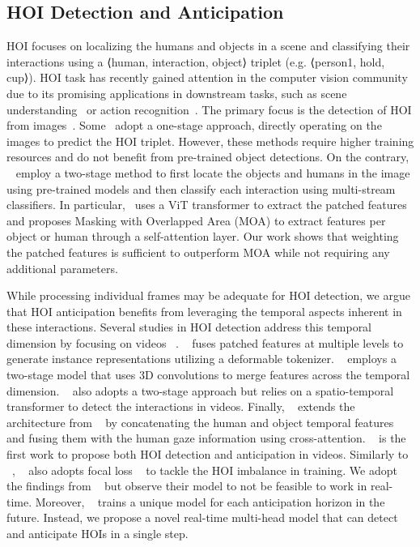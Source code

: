 \documentclass{article}
\begin{document}
\subsection{HOI Detection and Anticipation}
HOI focuses on localizing the humans and objects in a scene and classifying their interactions using a ⟨human, interaction, object⟩ triplet (e.g. ⟨person1, hold, cup⟩). HOI task has recently gained attention in the computer vision community due to its promising applications in downstream tasks, such as scene understanding~\citep{hoi_scene_understanding} or action recognition~\citep{hoi_har}. The primary focus is the detection of HOI from images~\citep{Xu2018, Ulutan2020, JunYI2023, Xiaoqian2022, Liao2022, park2023viplo}. Some~\citep{JunYI2023, Xiaoqian2022, Liao2022} adopt a one-stage approach, directly operating on the images to predict the HOI triplet. However, these methods require higher training resources and do not benefit from pre-trained object detections. On the contrary, ~\citep{Xu2018, Ulutan2020, park2023viplo} employ a two-stage method to first locate the objects and humans in the image using pre-trained models and then classify each interaction using multi-stream classifiers. In particular,~\citep{park2023viplo} uses a ViT transformer \citep{dosovitskiy2020vit} to extract the patched features and proposes Masking with Overlapped Area (MOA) to extract features per object or human through a self-attention layer. Our work shows that weighting the patched features is sufficient to outperform MOA while not requiring any additional parameters.

While processing individual frames may be adequate for HOI detection, we argue that HOI anticipation benefits from leveraging the temporal aspects inherent in these interactions. Several studies in HOI detection address this temporal dimension by focusing on videos ~\citep{Chiou2021, Cong2021, Tu2022, NI2023103741}. ~\citep{Tu2022} fuses patched features at multiple levels to generate instance representations utilizing a deformable tokenizer. ~\citep{Chiou2021} employs a two-stage model that uses 3D convolutions to merge features across the temporal dimension. ~\citep{Cong2021} also adopts a two-stage approach but relies on a spatio-temporal transformer \citep{transformer} to detect the interactions in videos. Finally, ~\citep{NI2023103741} extends the architecture from ~\citep{Cong2021} by concatenating the human and object temporal features and fusing them with the human gaze information using cross-attention. ~\citep{NI2023103741} is the first work to propose both HOI detection and anticipation in videos. Similarly to ~\citep{park2023viplo}, ~\citep{NI2023103741} also adopts focal loss ~\citep{focalloss} to tackle the HOI imbalance in training. We adopt the findings from ~\citep{NI2023103741} but observe their model to not be feasible to work in real-time. Moreover, ~\citep{NI2023103741} trains a unique model for each anticipation horizon in the future. Instead, we propose a novel real-time multi-head model that can detect and anticipate HOIs in a single step.
\end{document}
